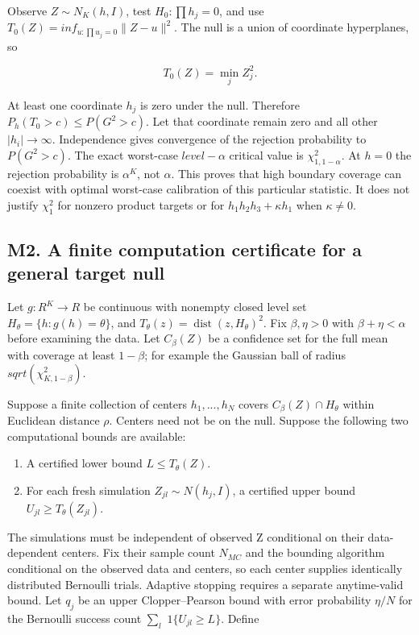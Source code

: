 \documentclass[
  11pt,
]{article}
\providecommand{\tightlist}{%
  \setlength{\itemsep}{0pt}\setlength{\parskip}{0pt}}
\begin{document}
Observe \(Z\sim N_K(h,I)\), test \(H_0:\prod h_j=0\), and use
\(T_0(Z)=inf_{u:\prod u_j=0}\|Z-u\|^{2}\). The null is a union of
coordinate hyperplanes, so

\[
 T_0(Z)=\min_j Z_j^2.
\]

At least one coordinate \(h_j\) is zero under the null. Therefore
\(P_h(T_0>c)\le P(G^{2}>c)\). Let that coordinate remain zero and all
other \(|h_i|\to \infty\). Independence gives convergence of the
rejection probability to \(P(G^{2}>c)\). The exact worst-case
\(level-\alpha\) critical value is \(\chi ^{2}_{1,1-\alpha }\). At
\(h=0\) the rejection probability is \(\alpha ^K\), not \(\alpha\). This
proves that high boundary coverage can coexist with optimal worst-case
calibration of this particular statistic. It does not justify
\(\chi ^{2}_1\) for nonzero product targets or for
\(h_1h_2h_3+\kappa h_1\) when \(\kappa ≠0\).

\subsection{M2. A finite computation certificate for a general target
null}\label{m2.-a-finite-computation-certificate-for-a-general-target-null}

Let \(g:R^K\to R\) be continuous with nonempty closed level set
\(H_\theta =\{h:g(h)=\theta \}\), and
\(T_\theta (z)=\operatorname{dist}(z,H_\theta )^{2}\). Fix
\(\beta ,\eta >0\) with \(\beta +\eta <\alpha\) before examining the
data. Let \(C_\beta (Z)\) be a confidence set for the full mean with
coverage at least \(1-\beta\); for example the Gaussian ball of radius
\(sqrt(\chi ^{2}_{K,1-\beta })\).

Suppose a finite collection of centers \(h_1,...,h_N\) covers
\(C_\beta (Z)∩H_\theta\) within Euclidean distance \(\rho\). Centers
need not be on the null. Suppose the following two computational bounds
are available:

\begin{enumerate}
\def\labelenumi{\arabic{enumi}.}
\tightlist
\item
  A certified lower bound \(L\le T_\theta (Z)\).
\item
  For each fresh simulation \(Z_{jl}\sim N(h_j,I)\), a certified upper
  bound \(U_{jl}\ge T_\theta (Z_{jl})\).
\end{enumerate}

The simulations must be independent of observed Z conditional on their
data-dependent centers. Fix their sample count \(N_{MC}\) and the
bounding algorithm conditional on the observed data and centers, so each
center supplies identically distributed Bernoulli trials. Adaptive
stopping requires a separate anytime-valid bound. Let \(q_j\) be an
upper Clopper--Pearson bound with error probability \(\eta /N\) for the
Bernoulli success count \(\sum _l\) \(1\{U_{jl}\ge L\}\). Define
\end{document}
